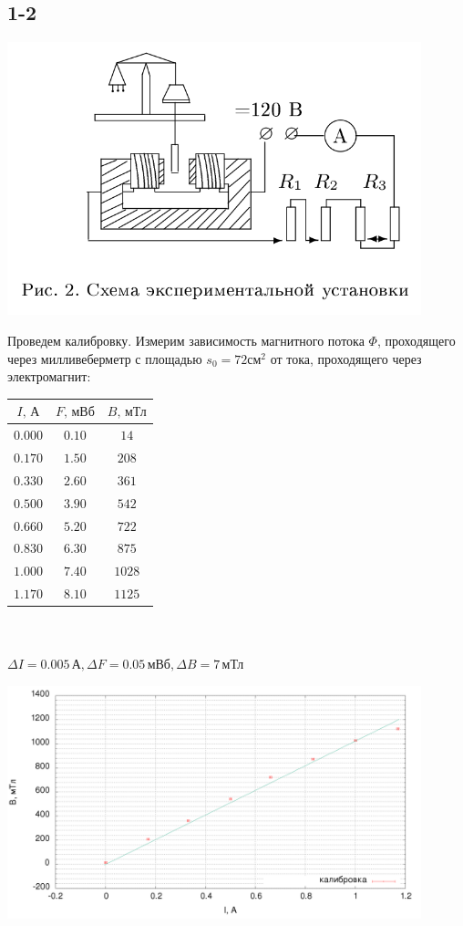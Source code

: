 \documentclass[a4paper,12pt]{article}
\begin{document}
\subsection*{1-2}
\begin{center}
\includegraphics[width=0.90\textwidth]{setup.png}
\end{center}
Проведем калибровку. Измерим зависимость магнитного потока $\Phi$, проходящего через милливеберметр с площадью $s_0 = 72\text{см}^2$ от тока, проходящего через электромагнит:
\begin{center}
\begin{tabular}{|c|c|c|}\hline
$I\text{, А}$&$F\text{, мВб}$&$B\text{, мТл}$\\\hline
$0.000$&$0.10$&$14$\\\hline
$0.170$&$1.50$&$208$\\\hline
$0.330$&$2.60$&$361$\\\hline
$0.500$&$3.90$&$542$\\\hline
$0.660$&$5.20$&$722$\\\hline
$0.830$&$6.30$&$875$\\\hline
$1.000$&$7.40$&$1028$\\\hline
$1.170$&$8.10$&$1125$\\\hline
\end{tabular}\\~\\
$\Delta I=0.005\,\text{А}, \Delta F=0.05\,\text{мВб}, \Delta B=7\,\text{мТл}$
\end{center}



\begin{center}
\includegraphics[width=0.90\textwidth]{plot.png}
\end{center}
\end{document}
